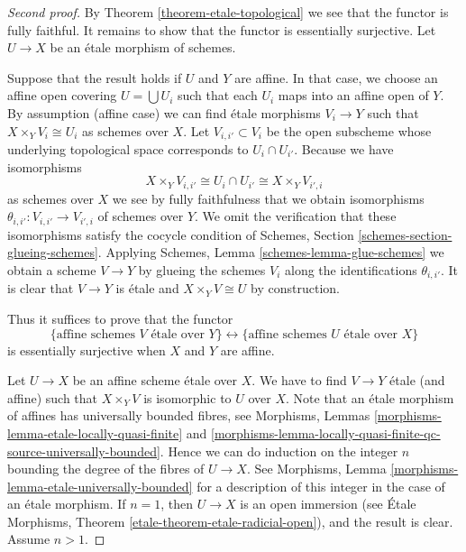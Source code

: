 \begin{proof}[Second proof]
By Theorem \ref{theorem-etale-topological}
we see that the functor is fully faithful.
It remains to show that the functor is essentially surjective.
Let $U \to X$ be an \'etale morphism of schemes.

\medskip\noindent
Suppose that the result holds if $U$ and $Y$ are affine.
In that case, we choose an affine open covering
$U = \bigcup U_i$ such that each $U_i$ maps
into an affine open of $Y$. By assumption (affine case) we can
find \'etale morphisms $V_i \to Y$ such that $X \times_Y V_i \cong U_i$
as schemes over $X$. Let $V_{i, i'} \subset V_i$
be the open subscheme whose underlying topological space
corresponds to $U_i \cap U_{i'}$. Because we have isomorphisms
$$
X \times_Y V_{i, i'} \cong U_i \cap U_{i'} \cong X \times_Y V_{i', i}
$$
as schemes over $X$ we see by fully faithfulness that we
obtain isomorphisms
$\theta_{i, i'} : V_{i, i'} \to V_{i', i}$ of schemes over $Y$.
We omit the verification that these isomorphisms satisfy the
cocycle condition of Schemes, Section \ref{schemes-section-glueing-schemes}.
Applying Schemes, Lemma \ref{schemes-lemma-glue-schemes}
we obtain a scheme $V \to Y$ by
glueing the schemes $V_i$ along the identifications $\theta_{i, i'}$.
It is clear that $V \to Y$ is \'etale and $X \times_Y V \cong U$
by construction.

\medskip\noindent
Thus it suffices to prove that the functor
\begin{equation}
\label{equation-affine-etale}
\{
\text{affine schemes }V\text{ \'etale over }Y
\}
\leftrightarrow
\{
\text{affine schemes }U\text{ \'etale over }X
\}
\end{equation}
is essentially surjective when $X$ and $Y$ are affine.

\medskip\noindent
Let $U \to X$ be an affine scheme \'etale over $X$.
We have to find $V \to Y$ \'etale (and affine) such that $X \times_Y V$
is isomorphic to $U$ over $X$. Note that an \'etale morphism of affines
has universally bounded fibres, see
Morphisms,
Lemmas \ref{morphisms-lemma-etale-locally-quasi-finite} and
\ref{morphisms-lemma-locally-quasi-finite-qc-source-universally-bounded}.
Hence we can do induction on the integer $n$ bounding the degree of the fibres
of $U \to X$. See
Morphisms, Lemma \ref{morphisms-lemma-etale-universally-bounded}
for a description of this integer in the case of an \'etale morphism.
If $n = 1$, then $U \to X$ is an open immersion (see
\'Etale Morphisms, Theorem \ref{etale-theorem-etale-radicial-open}),
and the result is clear. Assume $n > 1$.


\end{proof}
